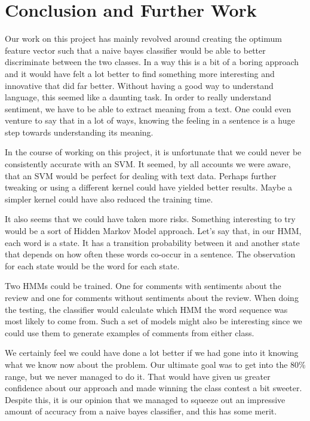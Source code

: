 \documentclass[]{report}
\begin{document}
\section{Conclusion and Further Work}
Our work on this project has mainly revolved around creating the optimum feature vector such that a naive bayes classifier would be able to better discriminate between the two classes.  In a way this is a bit of a boring approach and it would have felt a lot better to find something more interesting and innovative that did far better.  Without having a good way to understand language, this seemed like a daunting task.  In order to really understand sentiment, we have to be able to extract meaning from a text.  One could even venture to say that in a lot of ways, knowing the feeling in a sentence is a huge step towards understanding its meaning.

In the course of working on this project, it is unfortunate that we could never be consistently accurate with an SVM.  It seemed, by all accounts we were aware, that an SVM would be perfect for dealing with text data.  Perhaps further tweaking or using a different kernel could have yielded better results.  Maybe a simpler kernel could have also reduced the training time.

It also seems that we could have taken more risks.  Something interesting to try would be a sort of Hidden Markov Model approach.  Let's say that, in our HMM, each word is a state.  It has a transition probability between it and another state that depends on how often these words co-occur in a sentence.  The observation for each state would be the word for each state.

Two HMMs could be trained.  One for comments with sentiments about the review and one for comments without sentiments about the review.  When doing the testing, the classifier would calculate which HMM the word sequence was most likely to come from.  Such a set of models might also be interesting since we could use them to generate examples of comments from either class.

We certainly feel we could have done a lot better if we had gone into it knowing what we know now about the problem.  Our ultimate goal was to get into the 80\% range, but we never managed to do it.  That would have given us greater confidence about our approach and made winning the class contest a bit sweeter.  Despite this, it is our opinion that we managed to squeeze out an impressive amount of accuracy from a naive bayes classifier, and this has some merit.
\end{document}
